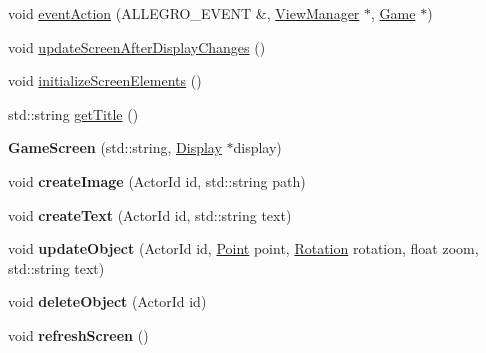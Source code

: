 \begin{DoxyCompactItemize}
\item 
void \hyperlink{classGameScreen_a2ca8233319e849881b40f6b51d70b5c2}{event\+Action} (A\+L\+L\+E\+G\+R\+O\+\_\+\+E\+V\+E\+NT \&, \hyperlink{classViewManager}{View\+Manager} $\ast$, \hyperlink{classGame}{Game} $\ast$)
\item 
void \hyperlink{classGameScreen_a1f82a990e5a99b6277d61a241f7ee249}{update\+Screen\+After\+Display\+Changes} ()
\item 
void \hyperlink{classGameScreen_a5dc1384fa03aa108acb594a25a37c6d3}{initialize\+Screen\+Elements} ()
\item 
std\+::string \hyperlink{classGameScreen_aed6639510a63371edde3c02b8772e965}{get\+Title} ()
\item 
{\bfseries Game\+Screen} (std\+::string, \hyperlink{classDisplay}{Display} $\ast$display)\hypertarget{classGameScreen_a938d3b8dcd74d5581bce846100893d65}{}\label{classGameScreen_a938d3b8dcd74d5581bce846100893d65}

\item 
void {\bfseries create\+Image} (Actor\+Id id, std\+::string path)\hypertarget{classGameScreen_abeea653575bf8c23ba338e4825ddfceb}{}\label{classGameScreen_abeea653575bf8c23ba338e4825ddfceb}

\item 
void {\bfseries create\+Text} (Actor\+Id id, std\+::string text)\hypertarget{classGameScreen_ae7bf62b6249da58e40dfffa4eb8d8bd9}{}\label{classGameScreen_ae7bf62b6249da58e40dfffa4eb8d8bd9}

\item 
void {\bfseries update\+Object} (Actor\+Id id, \hyperlink{classPoint}{Point} point, \hyperlink{classRotation}{Rotation} rotation, float zoom, std\+::string text)\hypertarget{classGameScreen_abd0496993fd77d75f51076fa4a4d73e3}{}\label{classGameScreen_abd0496993fd77d75f51076fa4a4d73e3}

\item 
void {\bfseries delete\+Object} (Actor\+Id id)\hypertarget{classGameScreen_ad352705fd0b44ec761149670e2b8d9f3}{}\label{classGameScreen_ad352705fd0b44ec761149670e2b8d9f3}

\item 
void {\bfseries refresh\+Screen} ()\hypertarget{classGameScreen_ac789a31dbf548073fc28753704ae8e92}{}\label{classGameScreen_ac789a31dbf548073fc28753704ae8e92}

\end{DoxyCompactItemize}


